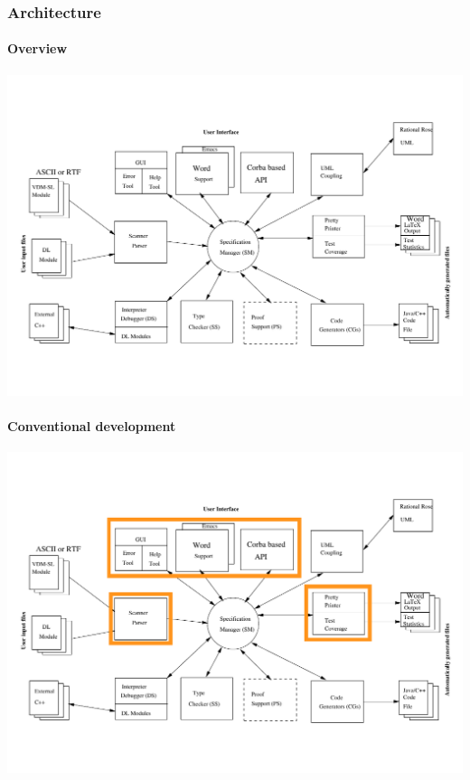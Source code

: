 \documentclass[slidestop,uncompress,mathserif,final]{beamer}
\begin{document}
\begin{frame}[c]
  \frametitle{Architecture}

   {
  \framesubtitle{Overview}
  \begin{center}
    \includegraphics[width=\textwidth]{images/vdmtools_arch.pdf}
  \end{center}
  }
   {
  \framesubtitle{Conventional development}
   \begin{center}
    \includegraphics[width=\textwidth]{images/vdmtools_arch_conv_dev.pdf}
  \end{center}
  }
\end{frame}
\end{document}
